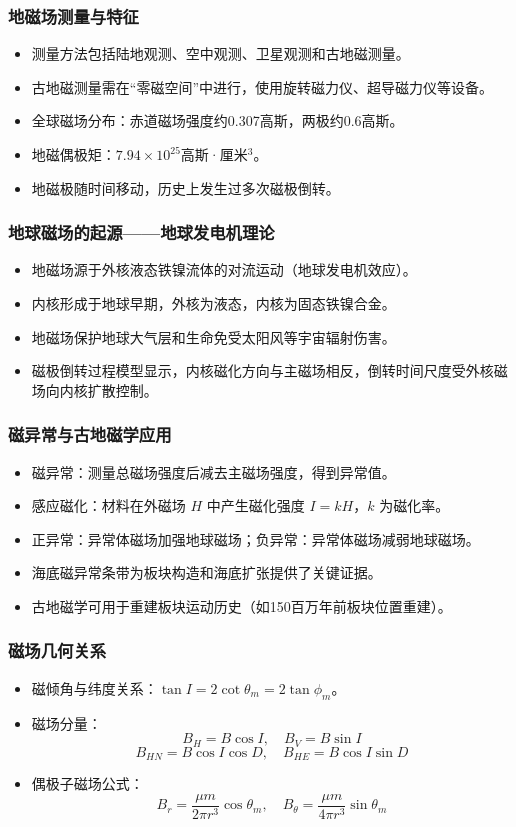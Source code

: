 \documentclass[12pt,a4paper]{article}
\begin{document}
	\subsubsection{地磁场测量与特征}
	\begin{itemize}
		\item 测量方法包括陆地观测、空中观测、卫星观测和古地磁测量。
		\item 古地磁测量需在“零磁空间”中进行，使用旋转磁力仪、超导磁力仪等设备。
		\item 全球磁场分布：赤道磁场强度约0.307高斯，两极约0.6高斯。
		\item 地磁偶极矩：\(7.94 \times 10^{25}\)高斯·厘米\(^3\)。
		\item 地磁极随时间移动，历史上发生过多次磁极倒转。
	\end{itemize}
	
	\subsubsection{地球磁场的起源——地球发电机理论}
	\begin{itemize}
		\item 地磁场源于外核液态铁镍流体的对流运动（地球发电机效应）。
		\item 内核形成于地球早期，外核为液态，内核为固态铁镍合金。
		\item 地磁场保护地球大气层和生命免受太阳风等宇宙辐射伤害。
		\item 磁极倒转过程模型显示，内核磁化方向与主磁场相反，倒转时间尺度受外核磁场向内核扩散控制。
	\end{itemize}
	
	\subsubsection{磁异常与古地磁学应用}
	\begin{itemize}
		\item 磁异常：测量总磁场强度后减去主磁场强度，得到异常值。
		\item 感应磁化：材料在外磁场 \(H\) 中产生磁化强度 \(I = kH\)，\(k\) 为磁化率。
		\item 正异常：异常体磁场加强地球磁场；负异常：异常体磁场减弱地球磁场。
		\item 海底磁异常条带为板块构造和海底扩张提供了关键证据。
		\item 古地磁学可用于重建板块运动历史（如150百万年前板块位置重建）。
	\end{itemize}
	
	\subsubsection{磁场几何关系}
	\begin{itemize}
		\item 磁倾角与纬度关系：\(\tan I = 2 \cot \theta_m = 2 \tan \phi_m\)。
		\item 磁场分量：
		\[
		B_H = B \cos I, \quad B_V = B \sin I
		\]
		\[
		B_{HN} = B \cos I \cos D, \quad B_{HE} = B \cos I \sin D
		\]
		\item 偶极子磁场公式：
		\[
		B_r = \frac{\mu m}{2\pi r^3} \cos \theta_m, \quad B_\theta = \frac{\mu m}{4\pi r^3} \sin \theta_m
		\]
	\end{itemize}
	
\end{document}
